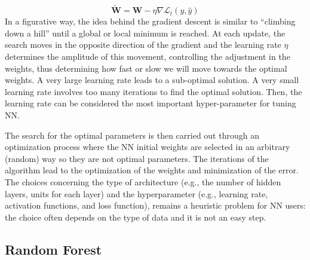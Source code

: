 \documentclass[a4,12pt]{article}
\begin{document}
\begin{equation}
\mathbf{\tilde{W}}=\mathbf{W}-\eta \nabla \mathcal{L}_t(y,\hat{y})
\end{equation}
In a figurative way, the idea behind the gradient descent is similar to “climbing down a hill” until a global or local minimum is reached. At each update, the search moves in the opposite direction of the gradient and the learning rate $\eta$ determines the amplitude of this movement, controlling the adjustment in the weights, thus determining how fast or slow we will move towards the optimal weights.
A very large learning rate leads to a sub-optimal solution. A very small learning rate involves too many iterations to find the optimal solution. 
Then, the learning rate can be considered the most important hyper-parameter for tuning NN.

The search for the optimal parameters is then carried out through an optimization process where the NN initial weights are selected in an arbitrary (random) way so they are not optimal parameters. The iterations of the algorithm lead to the optimization of the weights and minimization of the error. 
The choices concerning the type of architecture (e.g., the number of hidden layers, units for each layer) and the hyperparameter (e.g., learning rate, activation functions, and loss function), remains a heuristic problem for NN users: the choice often depends on the type of data and it is not an easy step. 



\subsection{Random Forest}





\end{document}

